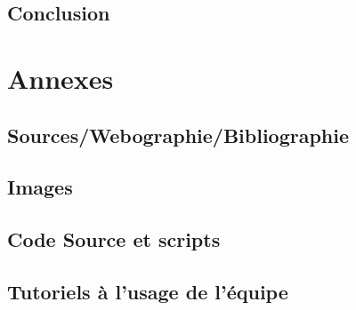 \documentclass[a4paper,12pt,one side,titlepage]{report}
\begin{document}
\chapter{Conclusion}

\part{Annexes}
\chapter{Sources/Webographie/Bibliographie}

\chapter{Images}

\chapter{Code Source et scripts}

\chapter{Tutoriels à l'usage de l'équipe}




\printglossaries
\end{document}
